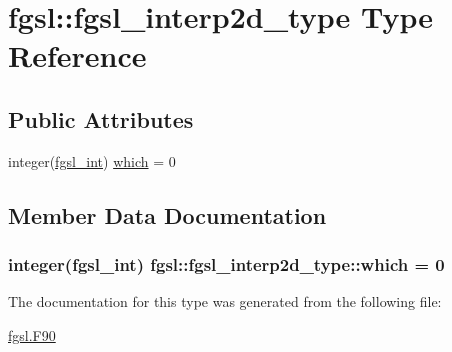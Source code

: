 \hypertarget{structfgsl_1_1fgsl__interp2d__type}{}\section{fgsl\+:\+:fgsl\+\_\+interp2d\+\_\+type Type Reference}
\label{structfgsl_1_1fgsl__interp2d__type}
\subsection*{Public Attributes}
\begin{DoxyCompactItemize}
\item 
integer(\hyperlink{namespacefgsl_a222deda1d7a0c0e845ce4a683318efeb}{fgsl\+\_\+int}) \hyperlink{structfgsl_1_1fgsl__interp2d__type_a475636746b5550a6641055d21db0c86e}{which} = 0
\end{DoxyCompactItemize}


\subsection{Member Data Documentation}
\hypertarget{structfgsl_1_1fgsl__interp2d__type_a475636746b5550a6641055d21db0c86e}{}
\subsubsection[{which}]{\setlength{\rightskip}{0pt plus 5cm}integer({\bf fgsl\+\_\+int}) fgsl\+::fgsl\+\_\+interp2d\+\_\+type\+::which = 0}\label{structfgsl_1_1fgsl__interp2d__type_a475636746b5550a6641055d21db0c86e}


The documentation for this type was generated from the following file\+:\begin{DoxyCompactItemize}
\item 
\hyperlink{fgsl_8F90}{fgsl.\+F90}\end{DoxyCompactItemize}
